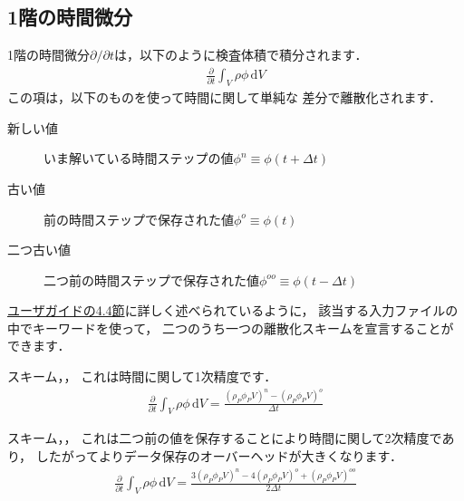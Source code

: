 \subsection{1階の時間微分}
\label{ssec:2.4.3}
%
1階の時間微分$\partial/\partial t$は，以下のように検査体積で積分されます．
\begin{align}
 \label{eq:2.20}
 \frac{\partial}{\partial t}\int_{V}\rho\phi\,\mathrm{d}V
\end{align}
この項は，以下のものを使って時間に関して単純な
%  
%
差分で離散化されます．
\begin{description}
 \item[新しい値] いま解いている時間ステップの値$\phi^{n} \equiv \phi(t + \Delta t)$
 \item[古い値] 前の時間ステップで保存された値$\phi^{o} \equiv \phi(t)$
 \item[二つ古い値] 二つ前の時間ステップで保存された値$\phi^{oo} \equiv \phi(t - \Delta t)$
\end{description}
\href{UserGuideJa.pdf#section.4.4}{ユーザガイドの4.4節}に詳しく述べられているように，
該当する入力ファイルの中でキーワードを使って，
二つのうち一つの離散化スキームを宣言することができます．
\begin{description}
%
%
 \item[オイラーの陰解法] スキーム，，
            これは時間に関して1次精度です．
            \begin{align}
             \label{eq:2.21}
             \frac{\partial}{\partial t}\int_{V}\rho\phi\,\mathrm{d}V
             = \frac{(\rho_{P}\phi_{P}V)^{n} - (\rho_{P}\phi_{P}V)^{o}}{\Delta t}
            \end{align}
%  
% 
\item[後退差分] スキーム，，
            これは二つ前の値を保存することにより時間に関して2次精度であり，
            したがってよりデータ保存のオーバーヘッドが大きくなります．
            \begin{align}
             \label{eq:2.22}
             \frac{\partial}{\partial t}\int_{V}\rho\phi\,\mathrm{d}V
             = \frac{3(\rho_{P}\phi_{P}V)^{n} - 4(\rho_{P}\phi_{P}V)^{o}
             + (\rho_{P}\phi_{P}V)^{oo}}{2\Delta t}
            \end{align}
\end{description}


